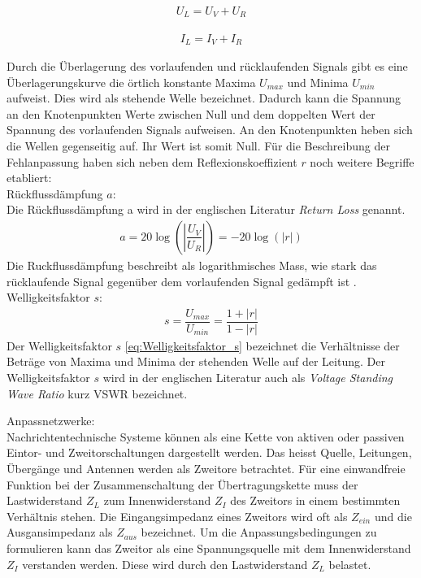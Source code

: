 \begin{eqnarray}\label{eq:AnpassungULast}
U_L = U_V + U_R
\end{eqnarray}

\begin{eqnarray}\label{eq:AnpassungILast}
I_L = I_V + I_R
\end{eqnarray}

Durch die Überlagerung des vorlaufenden und rücklaufenden Signals gibt es eine Überlagerungskurve die örtlich konstante Maxima $U_{max}$ und Minima $U_{min}$ aufweist. Dies wird als stehende Welle bezeichnet. Dadurch kann die Spannung an den Knotenpunkten Werte zwischen Null und dem doppelten Wert der Spannung des vorlaufenden Signals aufweisen. An den Knotenpunkten heben sich die Wellen gegenseitig auf. Ihr Wert ist somit Null. Für die Beschreibung der Fehlanpassung haben sich neben dem Reflexionskoeffizient  $r$ noch weitere Begriffe etabliert: \\

Rückflussdämpfung $a$:\\
Die Rückflussdämpfung a wird in der englischen Literatur \textit{Return Loss} genannt.
\begin{eqnarray}\label{eq:Ruckflussdämpfung_a}
a=20\log\left(\left| \dfrac{U_V}{U_R}\right| \right)=-20\log(|r|)
\end{eqnarray}
Die Ruckflussdämpfung beschreibt als logarithmisches Mass, wie stark das rücklaufende Signal gegenüber dem vorlaufenden Signal gedämpft ist \cite{Tekom}.\\

Welligkeitsfaktor $s$:
\begin{eqnarray}\label{eq:Welligkeitsfaktor_s}
s=\dfrac{U_{max}}{U_{min}}=\dfrac{1+|r|}{1-|r|}
\end{eqnarray}
Der Welligkeitsfaktor $s$ \ref{eq:Welligkeitsfaktor_s} bezeichnet die Verhältnisse der Beträge von Maxima und Minima der stehenden Welle auf der Leitung. Der Welligkeitsfaktor $s$ wird in der englischen Literatur auch als \textit{Voltage Standing Wave Ratio} kurz VSWR bezeichnet. \\

Anpassnetzwerke: \\
Nachrichtentechnische Systeme können als eine Kette von aktiven oder passiven Eintor- und Zweitorschaltungen dargestellt werden. Das heisst Quelle, Leitungen, Übergänge und Antennen werden als Zweitore betrachtet. Für eine einwandfreie Funktion bei der Zusammenschaltung der Übertragungskette muss der Lastwiderstand $Z_L$ zum Innenwiderstand $Z_I$ des Zweitors in einem bestimmten Verhältnis stehen. Die Eingangsimpedanz eines Zweitors wird oft als $Z_{ein}$ und die Ausgansimpedanz als $Z_{aus}$ bezeichnet. 
Um die Anpassungsbedingungen zu formulieren kann das Zweitor als eine Spannungsquelle mit dem Innenwiderstand $Z_I$ verstanden werden. Diese wird  durch den Lastwiderstand $Z_L$ belastet.

